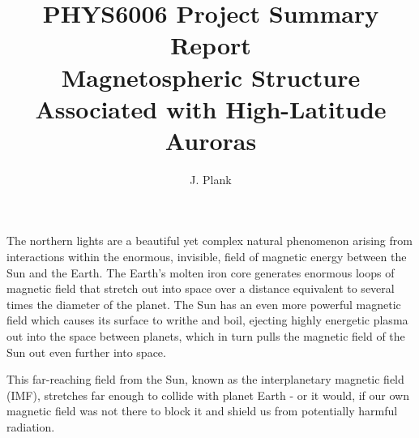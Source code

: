 \documentclass[12pt]{article}
\title{PHYS6006 Project Summary Report \\
       Magnetospheric Structure Associated with High-Latitude Auroras}
\author{J. Plank}
\begin{document}
\sloppy
\maketitle






The northern lights are a beautiful yet complex natural phenomenon arising from interactions within the enormous, invisible, field of magnetic energy between the Sun and the Earth. The Earth’s molten iron core generates enormous loops of magnetic field that stretch out into space over a distance equivalent to several times the diameter  of the planet. The Sun has an even more powerful magnetic field which causes its surface to writhe and boil, ejecting highly energetic plasma out into the space between planets, which in turn pulls the magnetic field of the Sun out even further into space. 

This far-reaching field from the Sun, known as the interplanetary magnetic field (IMF), stretches far enough to collide with planet Earth - or it would, if our own magnetic field was not  there to block it and shield us from potentially harmful radiation. 
\end{document}
